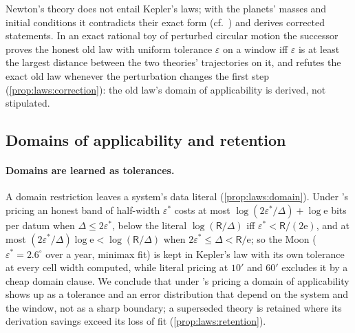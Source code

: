 Newton's theory does not entail Kepler's laws; with the planets' masses and initial conditions it contradicts their exact form (cf.\ \citealp{duhem1954aim}) and derives corrected statements. In an exact rational toy of perturbed circular motion the successor proves the honest old law with uniform tolerance $\varepsilon$ on a window iff $\varepsilon$ is at least the largest distance between the two theories' trajectories on it, and refutes the exact old law whenever the perturbation changes the first step (\cref{prop:laws:correction}): the old law's domain of applicability is derived, not stipulated.

\subsection{Domains of applicability and retention}\label{sec:laws:domains}

\paragraph{Domains are learned as tolerances.}\label{rem:laws:domainlearning}
A domain restriction leaves a system's data literal (\cref{prop:laws:domain}). Under \SAIabbr's pricing an honest band of half-width $\varepsilon^*$ costs at most $\log(2\varepsilon^*/\Delta)+\log\mathrm e$ bits per datum when $\Delta\le2\varepsilon^*$, below the literal $\log(\mathsf R/\Delta)$ iff $\varepsilon^*<\mathsf R/(2\mathrm e)$, and at most $(2\varepsilon^*/\Delta)\log\mathrm e<\log(\mathsf R/\Delta)$ when $2\varepsilon^*\le\Delta<\mathsf R/\mathrm e$; so the Moon ($\varepsilon^*=2.6^\circ$ over a year, minimax fit) is kept in Kepler's law with its own tolerance at every cell width computed, while literal pricing at $10'$ and $60'$ excludes it by a cheap domain clause. We conclude that under \SAIabbr's pricing a domain of applicability shows up as a tolerance and an error distribution that depend on the system and the window, not as a sharp boundary; a superseded theory is retained where its derivation savings exceed its loss of fit (\cref{prop:laws:retention}).
